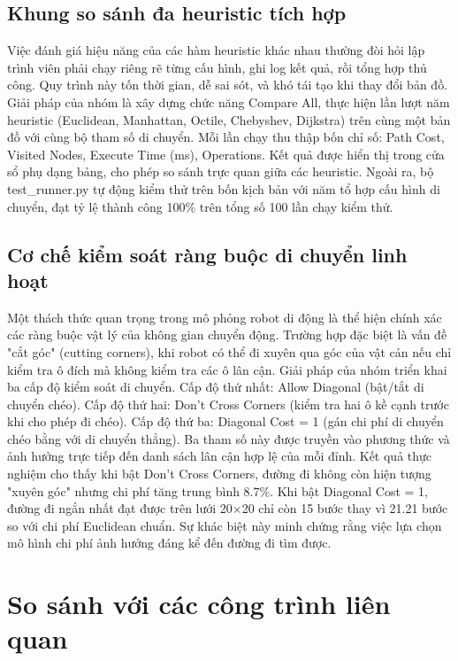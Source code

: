\documentclass[../BTL.tex]{subfiles}
\begin{document}
\subsection{Khung so sánh đa heuristic tích hợp}
\label{section:4.2.2}

Việc đánh giá hiệu năng của các hàm heuristic khác nhau thường đòi hỏi lập trình viên phải chạy riêng rẽ từng cấu hình, ghi log kết quả, rồi tổng hợp thủ công. Quy trình này tốn thời gian, dễ sai sót, và khó tái tạo khi thay đổi bản đồ. Giải pháp của nhóm là xây dựng chức năng Compare All, thực hiện lần lượt năm heuristic (Euclidean, Manhattan, Octile, Chebyshev, Dijkstra) trên cùng một bản đồ với cùng bộ tham số di chuyển. Mỗi lần chạy thu thập bốn chỉ số: Path Cost, Visited Nodes, Execute Time (ms), Operations. Kết quả được hiển thị trong cửa sổ phụ dạng bảng, cho phép so sánh trực quan giữa các heuristic. Ngoài ra, bộ test\_runner.py tự động kiểm thử trên bốn kịch bản với năm tổ hợp cấu hình di chuyển, đạt tỷ lệ thành công 100\% trên tổng số 100 lần chạy kiểm thử.

\subsection{Cơ chế kiểm soát ràng buộc di chuyển linh hoạt}
\label{section:4.2.3}

Một thách thức quan trọng trong mô phỏng robot di động là thể hiện chính xác các ràng buộc vật lý của không gian chuyển động. Trường hợp đặc biệt là vấn đề "cắt góc" (cutting corners), khi robot có thể đi xuyên qua góc của vật cản nếu chỉ kiểm tra ô đích mà không kiểm tra các ô lân cận. Giải pháp của nhóm triển khai ba cấp độ kiểm soát di chuyển. Cấp độ thứ nhất: Allow Diagonal (bật/tắt di chuyển chéo). Cấp độ thứ hai: Don't Cross Corners (kiểm tra hai ô kề cạnh trước khi cho phép đi chéo). Cấp độ thứ ba: Diagonal Cost = 1 (gán chi phí di chuyển chéo bằng với di chuyển thẳng). Ba tham số này được truyền vào phương thức và ảnh hưởng trực tiếp đến danh sách lân cận hợp lệ của mỗi đỉnh. Kết quả thực nghiệm cho thấy khi bật Don't Cross Corners, đường đi không còn hiện tượng "xuyên góc" nhưng chi phí tăng trung bình 8.7\%. Khi bật Diagonal Cost = 1, đường đi ngắn nhất đạt được trên lưới 20×20 chỉ còn 15 bước thay vì 21.21 bước so với chi phí Euclidean chuẩn. Sự khác biệt này minh chứng rằng việc lựa chọn mô hình chi phí ảnh hưởng đáng kể đến đường đi tìm được.

\section{So sánh với các công trình liên quan}
\label{section:4.3}
\end{document}
